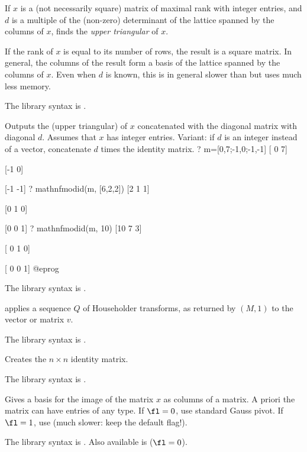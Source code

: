 \label{se:mathnfmod}
If $x$ is a (not necessarily square) matrix of
maximal rank with integer entries, and $d$ is a multiple of the (non-zero)
determinant of the lattice spanned by the columns of $x$, finds the
\emph{upper triangular}  of $x$.

If the rank of $x$ is equal to its number of rows, the result is a square
matrix. In general, the columns of the result form a basis of the lattice
spanned by the columns of $x$. Even when $d$ is known, this is in general
slower than  but uses much less memory.

The library syntax is .

\label{se:mathnfmodid}
Outputs the (upper triangular)
 of $x$ concatenated with the diagonal
matrix with diagonal $d$. Assumes that $x$ has integer entries.
Variant: if $d$ is an integer instead of a vector, concatenate $d$ times the
identity matrix.
\bprog
? m=[0,7;-1,0;-1,-1]
[ 0  7]

[-1  0]

[-1 -1]
? mathnfmodid(m, [6,2,2])
[2 1 1]

[0 1 0]

[0 0 1]
? mathnfmodid(m, 10)
[10 7 3]

[ 0 1 0]

[ 0 0 1]
@eprog

The library syntax is .

\label{se:mathouseholder}
applies a sequence $Q$ of Householder
transforms, as returned by $(M,1)$ to the vector or matrix $v$.

The library syntax is .

\label{se:matid}
Creates the $n\times n$ identity matrix.

The library syntax is .

\label{se:matimage}
Gives a basis for the image of the
matrix $x$ as columns of a matrix. A priori the matrix can have entries of
any type. If $\fl=0$, use standard Gauss pivot. If $\fl=1$, use
 (much slower: keep the default flag!).

The library syntax is .
Also available is  ($\fl=0$).

